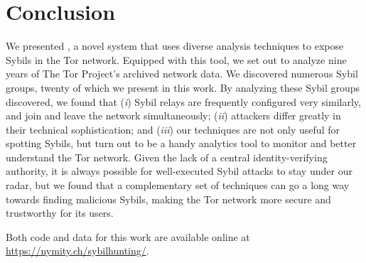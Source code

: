 \section{Conclusion}
\label{sec:conclusion}
We presented \sys, a novel system that uses diverse analysis techniques to
expose Sybils in the Tor network.  Equipped with this tool, we set out to
analyze nine years of The Tor Project's archived network data.  We discovered
numerous Sybil groups, twenty of which we present in this work.  By analyzing
these Sybil groups \sys discovered, we found that (\emph{i}) Sybil relays are
frequently configured very similarly, and join and leave the network
simultaneously; (\emph{ii}) attackers differ greatly in their technical
sophistication; and (\emph{iii}) our techniques are not only useful for spotting
Sybils, but turn out to be a handy analytics tool to monitor and better
understand the Tor network.  Given the lack of a central identity-verifying
authority, it is always possible for well-executed Sybil attacks to stay under
our radar, but we found that a complementary set of techniques can go a long way
towards finding malicious Sybils, making the Tor network more secure and
trustworthy for its users.

Both code and data for this work are available online at
\url{https://nymity.ch/sybilhunting/}.
